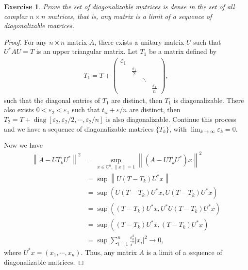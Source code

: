 \documentclass[11pt]{article}
\newtheorem{exercise}{Exercise}[section]
\theoremstyle{definition}
\numberwithin{equation}{subsection}
\begin{document}
\begin{exercise}{\rm *}
Prove the set of diagonalizable matrices is dense in the set of all complex $n \times n$ matrices, that is, any matrix is a limit of a sequence of diagonalizable matrices.
\end{exercise}
\begin{proof}
For any $n \times n$ matrix $A$, there exists a unitary matrix $U$ such that $U^*AU = T$ is an upper triangular matrix. Let $T_1$ be a matrix defined by
\begin{align*}
    T_1 = T + \begin{pmatrix} 
        \varepsilon_1 & & & \\
        & \frac{\varepsilon_1}{2} & & \\
        & & \ddots & \\
        & & & \frac{\varepsilon_1}{n}
    \end{pmatrix},
\end{align*}
such that the diagonal entries of $T_1$ are distinct, then $T_1$ is diagonalizable. There also exists $0 < \varepsilon_2 < \varepsilon_1$ such that $t_{ii} + \varepsilon/n$ are distinct, then $T_2 = T + \operatorname{diag}[\varepsilon_2, \varepsilon_2/2, \cdots, \varepsilon_2/n]$ is also diagonalizable. Continue this process and we have a sequence of diagonalizable matrices $\{T_k\}$, with $\lim_{k\to\infty}\varepsilon_k = 0$.

Now we have 
\begin{align*}
    \left\|A - U T_k U^*\right\|^2 & = \sup_{x \in \mathbb{C}^n, \|x\| = 1} \left\|(A - U T_k U^*)x\right\|^2 \\
    & = \sup \left\|U(T - T_k)U^*x\right\| \\
    & = \sup \left(U(T - T_k)U^*x, U(T - T_k)U^*x \right) \\
    & = \sup \left((T - T_k)U^*x, U^*U(T - T_k)U^*x \right) \\
    & = \sup \left((T - T_k)U^*x, (T - T_k)U^*x \right)\\
    & = \sup \sum^n_{i=1} \frac{\varepsilon_k^2}{i^2} |x_i|^2 \to 0,
\end{align*}
where $U^* x = (x_1, \cdots, x_n)$. Thus, any matrix $A$ is a limit of a sequence of diagonalizable matrices.
\end{proof}

\medskip
\end{document}
